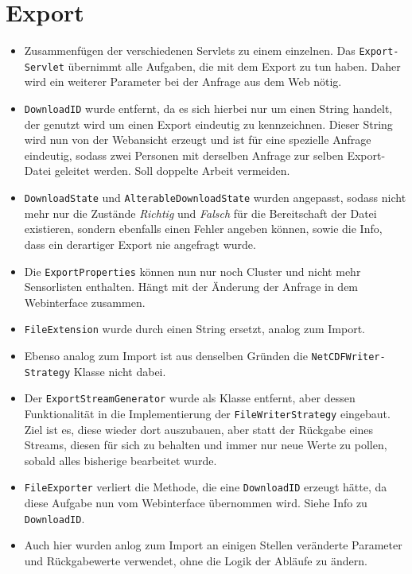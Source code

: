 \section{Export}
\begin{itemize}
	\item Zusammenfügen der verschiedenen Servlets zu einem einzelnen. Das \texttt{Export-\\Servlet} übernimmt alle Aufgaben, die mit dem Export zu tun haben. Daher wird ein weiterer Parameter bei der Anfrage aus dem Web nötig.
	\item \texttt{DownloadID} wurde entfernt, da es sich hierbei nur um einen String handelt, der genutzt wird um einen Export eindeutig zu kennzeichnen. Dieser String wird nun von der Webansicht erzeugt und ist für eine spezielle Anfrage eindeutig, sodass zwei Personen mit derselben Anfrage zur selben Export-Datei geleitet werden. Soll doppelte Arbeit vermeiden.
	\item \texttt{DownloadState} und \texttt{AlterableDownloadState} wurden angepasst, sodass nicht mehr nur die Zustände \textit{Richtig} und \textit{Falsch} für die Bereitschaft der Datei existieren, sondern ebenfalls einen Fehler angeben können, sowie die Info, dass ein derartiger Export nie angefragt wurde.
	\item Die \texttt{ExportProperties} können nun nur noch Cluster und nicht mehr Sensorlisten enthalten. Hängt mit der Änderung der Anfrage in dem Webinterface zusammen.
	\item \texttt{FileExtension} wurde durch einen String ersetzt, analog zum Import.
	\item Ebenso analog zum Import ist aus denselben Gründen die \texttt{NetCDFWriter-\\Strategy} Klasse nicht dabei.
	\item Der \texttt{ExportStreamGenerator} wurde als Klasse entfernt, aber dessen Funktionalität in die Implementierung der \texttt{FileWriterStrategy} eingebaut. Ziel ist es, diese wieder dort auszubauen, aber statt der Rückgabe eines Streams, diesen für sich zu behalten und immer nur neue Werte zu pollen, sobald alles bisherige bearbeitet wurde.
	\item \texttt{FileExporter} verliert die Methode, die eine \texttt{DownloadID} erzeugt hätte, da diese Aufgabe nun vom Webinterface übernommen wird. Siehe Info zu \texttt{DownloadID}.
	\item Auch hier wurden anlog zum Import an einigen Stellen veränderte Parameter und Rückgabewerte verwendet, ohne die Logik der Abläufe zu ändern.
\end{itemize}
